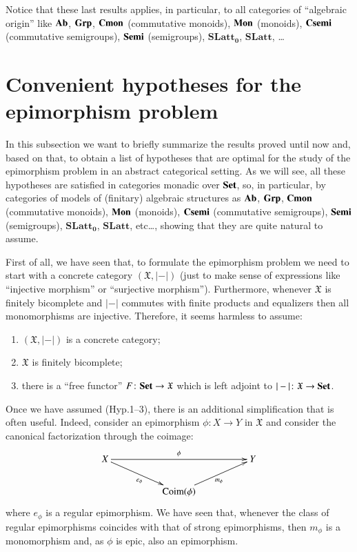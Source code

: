 \documentclass[12pt]{article}
\theoremstyle{definition}
\def\X{\mathfrak X}
\def\Coim{\mathrm{Coim}}
\newcommand{\Set}{\textbf{\textup{Set}}}
\newcommand{\Ab}{\textbf{\textup{Ab}}}
\newcommand{\Grp}{\textbf{\textup{Grp}}}
\newcommand{\Mon}{\textbf{\textup{Mon}}}
\newcommand{\Cmon}{\textbf{\textup{Cmon}}}
\newcommand{\Semi}{\textbf{\textup{Semi}}}
\newcommand{\Csemi}{\textbf{\textup{Csemi}}}
\newcommand{\SLatt}{\mathbf{SLatt_0}}
\newcommand{\SLattnobottom}{\mathbf{SLatt}}
\numberwithin{equation}{section}
\begin{document}
Notice that these last results applies, in particular, to all categories of ``algebraic origin'' like $\Ab$, $\Grp$, $\Cmon$ (commutative monoids), $\Mon$ (monoids), $\Csemi$ (commutative semigroups), $\Semi$ (semigroups), $\SLatt$, $\SLattnobottom$, \dots

\section{Convenient hypotheses for the epimorphism problem}\label{convenient_setting_sec}

In this subsection we want to briefly summarize the results proved until now and, based on that, to obtain a list of hypotheses that are optimal for the study of the epimorphism problem in an abstract categorical setting. As we will see, all these hypotheses are satisfied in categories monadic over $\Set$, so, in particular, by  categories of models of (finitary) algebraic structures as $\Ab$, $\Grp$, $\Cmon$ (commutative monoids), $\Mon$ (monoids), $\Csemi$ (commutative semigroups), $\Semi$ (semigroups), $\SLatt$, $\SLattnobottom$, etc\dots, showing that they are quite natural to assume.

First of all, we have seen that, to formulate the epimorphism problem we need to start with a concrete category $(\X,|-|)$ (just to make sense of expressions like ``injective morphism'' or ``surjective morphism''). Furthermore, whenever $\X$ is finitely bicomplete and $|-|$ commutes with finite products and equalizers then all monomorphisms are injective. Therefore, it seems harmless to assume:
\begin{enumerate}[\rm ({Hyp.}1)]
\item $(\X,|-|)$ is a concrete category;
\item $\X$ is finitely bicomplete;
\item there is a ``free functor'' $F\colon \Set \to \X$ which is left adjoint to $|-|\colon \X\to \Set$. 
\end{enumerate}

Once we have assumed (Hyp.1--3), there is an additional simplification that is often useful. Indeed, consider an epimorphism $\phi\colon X\to Y$ in $\X$ and consider the canonical factorization through the coimage:
\[
\xymatrix@R=20pt@C=50pt{
X\ar[rr]^{\phi}\ar[dr]_{e_\phi}&&Y\\
&\Coim(\phi)\ar[ur]_{m_\phi}
}
\] 
where $e_\phi$ is a regular epimorphism. We have seen that, whenever the class of regular epimorphisms coincides with that of strong epimorphisms, then $m_\phi$ is a monomorphism and, as $\phi$ is epic, also an epimorphism. 
\end{document}

